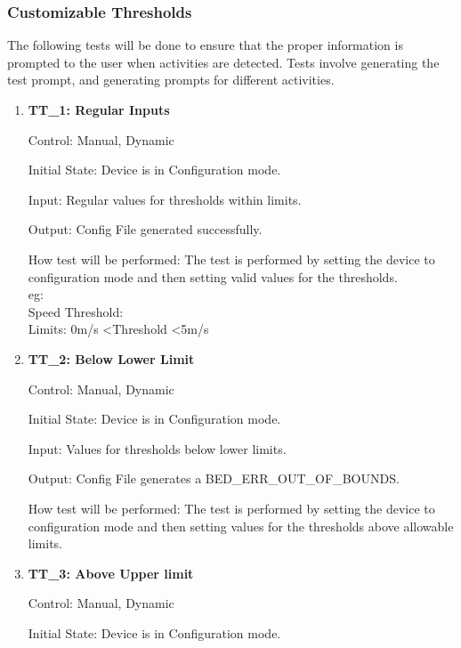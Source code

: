 \documentclass[12pt, titlepage]{article}
\begin{document}
\subsubsection{Customizable Thresholds}

The following tests will be done to ensure that the proper information is prompted to the user when activities are detected. Tests involve generating the test prompt, and generating prompts for different activities.
		
\begin{enumerate}
	\item{\textbf{TT\_1: Regular Inputs} \\}\label{TT1}
	
		Control: Manual, Dynamic
							
		Initial State: Device is in Configuration mode.
							
		Input: Regular values for thresholds within limits.
		
		Output: Config File generated successfully.
		
		How test will be performed: The test is performed by setting the device to configuration mode and then setting valid values for the thresholds.\\
		eg: \\
		Speed Threshold:\\
		Limits: 0m/s \textless Threshold \textless 5m/s

	\item{\textbf{TT\_2: Below Lower Limit} \\}\label{TT2}
	
		Control: Manual, Dynamic
							
		Initial State: Device is in Configuration mode.
							
		Input: Values for thresholds below lower limits.
		
		Output: Config File generates a BED\_ERR\_OUT\_OF\_BOUNDS.

		How test will be performed: The test is performed by setting the device to configuration mode and then setting values for the thresholds above allowable limits.

\pagebreak

	\item{\textbf{TT\_3: Above Upper limit }\\}\label{TT3}
	
		Control: Manual, Dynamic
							
		Initial State: Device is in Configuration mode.
							

\end{enumerate}
\end{document}
